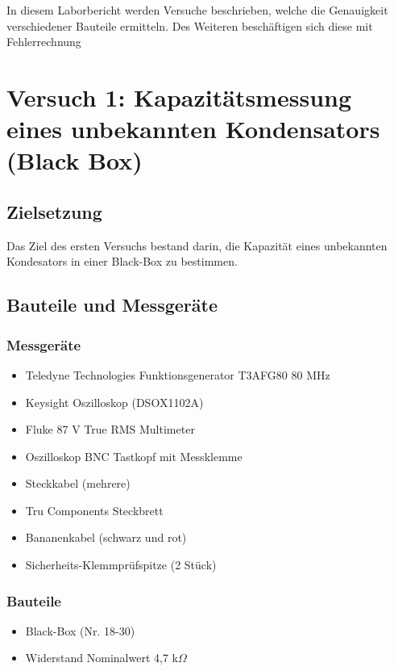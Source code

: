 \documentclass[a4paper,12pt]{article}
\begin{document}
\noindent In diesem Laborbericht werden Versuche beschrieben, welche die Genauigkeit verschiedener Bauteile ermitteln. Des Weiteren beschäftigen sich diese mit Fehlerrechnung



\newpage

\section{Versuch 1: Kapazitätsmessung eines unbekannten Kondensators (Black Box)}

\subsection{Zielsetzung}
Das Ziel des ersten Versuchs bestand darin, die Kapazität eines unbekannten Kondesators in einer Black-Box zu bestimmen. 

\subsection{Bauteile und Messgeräte}
\subsubsection*{Messgeräte}
\begin{itemize}
\item Teledyne Technologies Funktionsgenerator T3AFG80 80 MHz
\item Keysight Oszilloskop (DSOX1102A)
\item Fluke 87 V True RMS Multimeter
\item Oszilloskop BNC Tastkopf mit Messklemme
\item Steckkabel (mehrere)
\item Tru Components Steckbrett
\item Bananenkabel (schwarz und rot)
\item Sicherheits-Klemmprüfspitze (2 Stück)
\end{itemize}

\subsubsection*{Bauteile}
\begin{itemize}
\item Black-Box (Nr. 18-30)
\item Widerstand Nominalwert 4,7 k$\Omega$
\end{itemize}
\newpage
\end{document}
